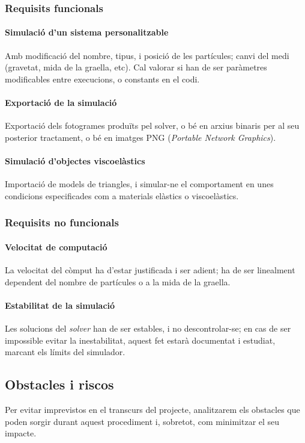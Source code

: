 \documentclass[a4paper]{report}
\begin{document}
	\subsubsection{Requisits funcionals}
	\paragraph{Simulació d'un sistema personalitzable} Amb modificació del nombre, tipus, i posició de les partícules; canvi del medi (gravetat, mida de la graella, etc). Cal valorar si han de ser paràmetres modificables entre execucions, o constants en el codi.
	\paragraph{Exportació de la simulació} Exportació dels fotogrames produïts pel solver, o bé en arxius binaris per al seu posterior tractament, o bé en imatges PNG (\textit{Portable Network Graphics}).
 	\paragraph{Simulació d'objectes viscoelàstics} Importació de models de triangles, i simular-ne el comportament en unes condicions especificades com a materials elàstics o viscoelàstics.
	
	\subsubsection{Requisits no funcionals}
	\paragraph{Velocitat de computació} La velocitat del còmput ha d'estar justificada i ser adient; ha de ser linealment dependent del nombre de partícules o a la mida de la graella.
	\paragraph{Estabilitat de la simulació} Les solucions del \textit{solver} han de ser estables, i no descontrolar-se; en cas de ser impossible evitar la inestabilitat, aquest fet estarà documentat i estudiat, marcant els límits del simulador.
	
	
	\subsection{Obstacles i riscos}
	Per evitar imprevistos en el transcurs del projecte, analitzarem els obstacles que poden sorgir durant aquest procediment i, sobretot, com minimitzar el seu impacte.
\end{document}
